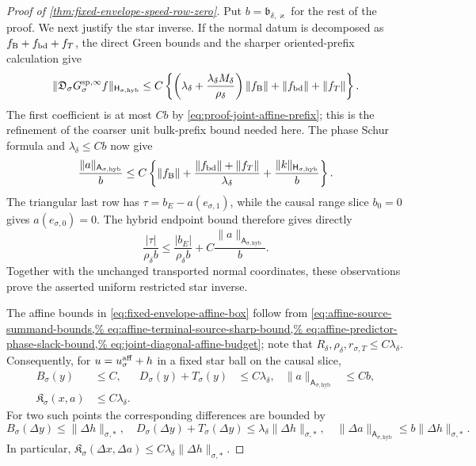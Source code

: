 \begin{proof}[Proof of
\cref{thm:fixed-envelope-speed-row-zero}]
Put \(b=\mathfrak b_{\delta,\varkappa}\) for the rest of the proof.
We next justify the star inverse.  If the normal datum is decomposed as
\(f_{\rm B}+f_{\rm bd}+f_T\), the direct Green bounds and the sharper
oriented-prefix calculation give
\begin{equation}
 \|\mathfrak D_\sigma
       G_\sigma^{\rm sp,\infty}f\|_
          {\mathsf H_{\sigma,\mathrm{hyb}}}
 \le C\left\{
   \left(\lambda_\delta+
       \frac{\lambda_\delta M_\delta}{\rho_\delta}\right)
          \|f_{\rm B}\|
       +\|f_{\rm bd}\|+\|f_T\|\right\}.           \label{eq:proof-fixed-envelope-refined-action}
\end{equation}
The first coefficient is at most \(Cb\) by
\cref{eq:proof-joint-affine-prefix}; this is the refinement of the
coarser unit bulk-prefix bound needed here.  The phase Schur formula and
\(\lambda_\delta\le Cb\) now give
\[
 \frac{\|a\|_{\mathsf A_{\sigma,\mathrm{hyb}}}}b
 \le C\left\{\|f_{\rm B}\|
   +\frac{\|f_{\rm bd}\|+\|f_T\|}{\lambda_\delta}
   +\frac{\|k\|_{\mathsf H_{\sigma,\mathrm{hyb}}}}b\right\}.
\]
The triangular last row has
\(\tau=b_E-a(e_{\sigma,1})\), while the causal range slice \(b_0=0\)
gives \(a(e_{\sigma,0})=0\).  The hybrid endpoint bound therefore gives
directly
\[
 \frac{|\tau|}{\rho_\delta b}
 \le \frac{|b_E|}{\rho_\delta b}
      +C\frac{\|a\|_{\mathsf A_{\sigma,\mathrm{hyb}}}}b.
\]
Together with the unchanged transported normal coordinates, these
observations prove the asserted uniform restricted star inverse.

The affine bounds in
\cref{eq:fixed-envelope-affine-box} follow from
\cref{eq:affine-source-summand-bounds,%
eq:affine-terminal-source-sharp-bound,%
eq:affine-predictor-phase-slack-bound,%
eq:joint-diagonal-affine-budget}; note that
\(R_\delta,\rho_\delta,r_{\sigma,T}\le C\lambda_\delta\).
Consequently, for
\(u=u_\sigma^{\rm aff}+h\) in a fixed star ball on the causal slice,
\begin{align}
 B_\sigma(y)&\le C,&
 D_\sigma(y)+T_\sigma(y)&\le C\lambda_\delta,&
 \|a\|_{\mathsf A_{\sigma,\mathrm{hyb}}}&\le Cb,            \label{eq:proof-fixed-envelope-affine-tube}\\
 \mathfrak K_\sigma(x,a)&\le C\lambda_\delta.               \label{eq:proof-fixed-envelope-kinetic-tube}
\end{align}
For two such points the corresponding differences are bounded by
\begin{equation}
 B_\sigma(\Delta y)\le\|\Delta h\|_{\sigma,*},\quad
 D_\sigma(\Delta y)+T_\sigma(\Delta y)
       \le\lambda_\delta\|\Delta h\|_{\sigma,*},\quad
 \|\Delta a\|_{\mathsf A_{\sigma,\mathrm{hyb}}}
       \le b\|\Delta h\|_{\sigma,*}.             \label{eq:proof-fixed-envelope-star-differences}
\end{equation}
In particular,
\(\mathfrak K_\sigma(\Delta x,\Delta a)
\le C\lambda_\delta\|\Delta h\|_{\sigma,*}\).


\end{proof}

